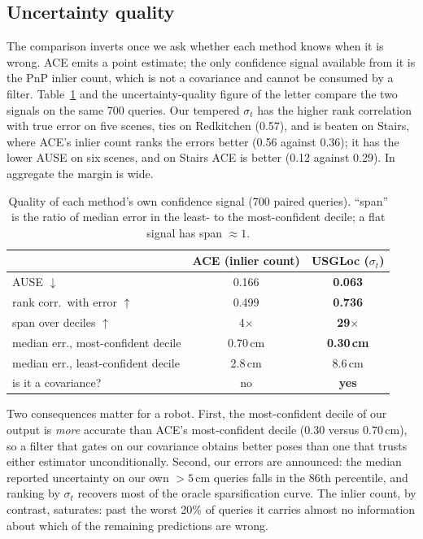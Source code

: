 \documentclass[journal]{IEEEtran}
\newcommand{\method}{USGLoc}
\begin{document}
\subsection{Uncertainty quality}
The comparison inverts once we ask whether each method knows when it is
wrong. ACE emits a point estimate; the only confidence signal available
from it is the PnP inlier count, which is not a covariance and cannot be
consumed by a filter. Table~\ref{tab:unc-compare} and the uncertainty-quality
figure of the letter compare the two signals on the same 700 queries. Our tempered $\sigma_t$ has the higher rank correlation with true error on five scenes, ties on Redkitchen (0.57), and is beaten on Stairs, where ACE's inlier count ranks the errors better (0.56 against 0.36); it has the lower AUSE on six scenes, and on Stairs ACE is better (0.12 against 0.29). In aggregate the margin is wide.

\begin{table}[t]
\caption{Quality of each method's own confidence signal (700 paired
queries). ``span'' is the ratio of median error in the least- to the
most-confident decile; a flat signal has span $\approx 1$.}
\label{tab:unc-compare}
\centering\footnotesize
\setlength{\tabcolsep}{4pt}
\begin{tabular}{@{}lcc@{}}
\toprule
 & ACE (inlier count) & \method{} ($\sigma_t$) \\
\midrule
AUSE $\downarrow$                    & 0.166 & \textbf{0.063} \\
rank corr.\ with error $\uparrow$    & 0.499 & \textbf{0.736} \\
span over deciles $\uparrow$         & 4$\times$ & \textbf{29$\times$} \\
median err., most-confident decile   & 0.70\,cm & \textbf{0.30\,cm} \\
median err., least-confident decile  & 2.8\,cm & 8.6\,cm \\
is it a covariance?                  & no & \textbf{yes} \\
\bottomrule
\end{tabular}
\end{table}

Two consequences matter for a robot. First, the most-confident decile of
our output is \emph{more} accurate than ACE's most-confident decile
(0.30 versus 0.70\,cm), so a filter that gates on our covariance obtains
better poses than one that trusts either estimator unconditionally.
Second, our errors are announced: the median reported uncertainty on our
own $>5$\,cm queries falls in the 86th percentile, and ranking by $\sigma_t$
recovers most of the oracle sparsification curve. The inlier count, by
contrast, saturates: past the worst 20\% of queries it carries almost no
information about which of the remaining predictions are wrong.
\end{document}
